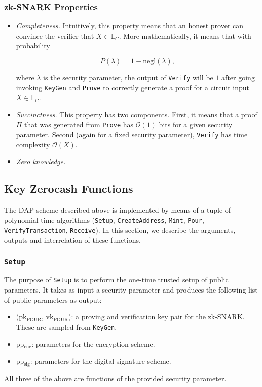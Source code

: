 \documentclass{article}
\begin{document}
\subsubsection{zk-SNARK Properties}
\begin{itemize}
\item \emph{Completeness.} Intuitively, this property means that an honest prover can convince the verifier that $X \in \mathbb{L}_C$. More mathematically, it means that with probability

\begin{equation}
P(\lambda) = 1 - \text{negl}(\lambda),
\end{equation}

where $\lambda$ is the security parameter, the output of \texttt{Verify} will be $1$ after going invoking \texttt{KeyGen} and \texttt{Prove} to correctly generate a proof for a circuit input $X \in \mathbb{L}_C$.

\item \emph{Succinctness.} This property has two components. First, it means that a proof $\Pi$ that was generated from \texttt{Prove} has $\mathcal{O}(1)$ bits for a given security parameter. Second (again for a fixed security parameter), \texttt{Verify} has time complexity $\mathcal{O}(X)$.

\item \emph{Zero knowledge.}
\end{itemize}

\subsection{Key Zerocash Functions}
The DAP scheme described above is implemented by means of a tuple of polynomial-time algorithms (\texttt{Setup}, \texttt{CreateAddress}, \texttt{Mint}, \texttt{Pour}, \texttt{VerifyTransaction}, \texttt{Receive}). In this section, we describe the arguments, outputs and interrelation of these functions.

\subsubsection{\texttt{Setup}}
The purpose of \texttt{Setup} is to perform the one-time trusted setup of public parameters. It takes as input a security parameter and produces the following list of public parameters as output:
\begin{itemize}
\item (pk$_{\text{POUR}}$, vk$_{\text{POUR}}$): a proving and verification key pair for the zk-SNARK. These are sampled from \texttt{KeyGen}.
\item pp$_{\text{enc}}$: parameters for the encryption scheme.
\item pp$_{\text{sig}}$: parameters for the digital signature scheme.
\end{itemize}
All three of the above are functions of the provided security parameter.
\end{document}
